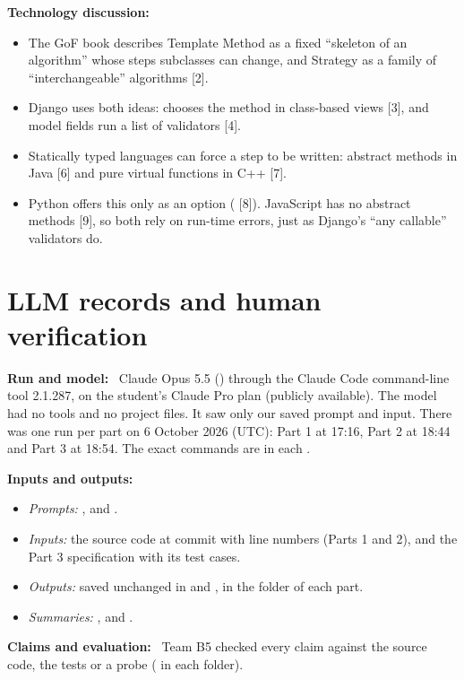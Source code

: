\documentclass[11pt,a4paper]{article}
\newcommand{\field}[1]{\textbf{#1:}\ }
\newcommand{\code}[1]{\texttt{\detokenize{#1}}}
\begin{document}
\field{Technology discussion}
\begin{itemize}
\item The GoF book describes Template Method as a fixed ``skeleton of an algorithm'' whose steps subclasses can change, and Strategy as a family of ``interchangeable'' algorithms [2].
\item Django uses both ideas: \code{dispatch()} chooses the method in class-based views [3], and model fields run a list of validators [4].
\item Statically typed languages can force a step to be written: abstract methods in Java [6] and pure virtual functions in C++ [7].
\item Python offers this only as an option (\code{abc} [8]). JavaScript has no abstract methods [9], so both rely on run-time errors, just as Django's ``any callable'' validators do.
\end{itemize}

\section{LLM records and human verification}
\field{Run and model} Claude Opus 5.5 (\code{claude-opus-5-5}) through the Claude Code command-line tool 2.1.287, on the student's Claude Pro plan (publicly available).
The model had no tools and no project files. It saw only our saved prompt and input.
There was one run per part on 6 October 2026 (UTC): Part 1 at 17:16, Part 2 at 18:44 and Part 3 at 18:54.
The exact commands are in each .\par
\field{Inputs and outputs}
\begin{itemize}
\item \emph{Prompts:} ,  and .
\item \emph{Inputs:} the source code at commit \code{5943319} with line numbers (Parts 1 and 2), and the Part 3 specification with its test cases.
\item \emph{Outputs:} saved unchanged in  and , in the  folder of each part.
\item \emph{Summaries:} ,  and .
\end{itemize}
\field{Claims and evaluation} Team B5 checked every claim against the source code, the tests or a probe ( in each  folder).
\end{document}
